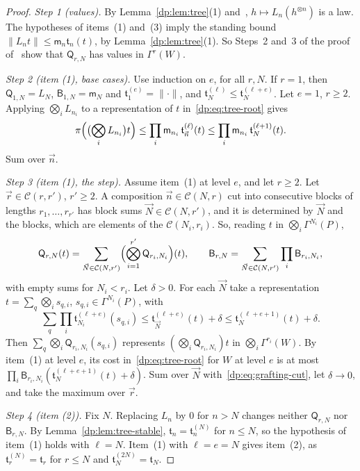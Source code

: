 \documentclass[11pt]{amsart}
\theoremstyle{definition}
\theoremstyle{remark}
\numberwithin{equation}{section}
\newcommand{\norm}[1]{\lVert #1\rVert}
\theoremstyle{plain}
\theoremstyle{definition}
\theoremstyle{plain}
\begin{document}
\begin{proof}
\emph{Step 1 (values).} By Lemma~\ref{dp:lem:tree}(1) and~\cite[Lemma~Q.1(2)]{I}, $h\mapsto L_n(h^{\otimes n})$ is a law. The hypotheses of items~(1) and~(3) imply the standing bound $\norm{L_nt}\le\mathsf m_n\mathfrak t_n(t)$, by Lemma~\ref{dp:lem:tree}(1). So Steps~2 and~3 of the proof of~\cite[Lemma~Q.4]{I} show that $\mathsf Q_{r,N}$ has values in $\Gamma^r(W)$.

\emph{Step 2 (item (1), base cases).} Use induction on $e$, for all $r,N$. If $r=1$, then $\mathsf Q_{1,N}=L_N$, $\mathsf B_{1,N}=\mathsf m_N$ and $\mathfrak t^{(e)}_1=\norm\cdot$, and $\mathfrak t^{(\ell)}_N\le\mathfrak t^{(\ell+e)}_N$. Let $e=1$, $r\ge2$. Applying $\bigotimes_iL_{n_i}$ to a representation of $t$ in~\eqref{dp:eq:tree-root} gives
\[
 \pi\Bigl(\bigl(\bigotimes_iL_{n_i}\bigr)t\Bigr)\le\prod_i\mathsf m_{n_i}\,\mathfrak t^{(\ell)}_{\vec n}(t)\le\prod_i\mathsf m_{n_i}\,\mathfrak t^{(\ell+1)}_N(t).
\]
Sum over $\vec n$.

\emph{Step 3 (item (1), the step).} Assume item~(1) at level $e$, and let $r\ge2$. Let $\vec r\in\mathcal C(r,r')$, $r'\ge2$. A composition $\vec n\in\mathcal C(N,r)$ cut into consecutive blocks of lengths $r_1,\dots,r_{r'}$ has block sums $\vec N\in\mathcal C(N,r')$, and it is determined by $\vec N$ and the blocks, which are elements of the $\mathcal C(N_i,r_i)$. So, reading $t$ in $\bigotimes_i\Gamma^{N_i}(P)$,
\begin{equation}\label{dp:eq:grafting-cut}
 \mathsf Q_{r,N}(t)=\sum_{\vec N\in\mathcal C(N,r')}\Bigl(\bigotimes_{i=1}^{r'}\mathsf Q_{r_i,N_i}\Bigr)(t),\qquad
 \mathsf B_{r,N}=\sum_{\vec N\in\mathcal C(N,r')}\prod_i\mathsf B_{r_i,N_i},
\end{equation}
with empty sums for $N_i<r_i$. Let $\delta>0$. For each $\vec N$ take a representation $t=\sum_q\bigotimes_is_{q,i}$, $s_{q,i}\in\Gamma^{N_i}(P)$, with
\[
 \sum_q\prod_i\mathfrak t^{(\ell+e)}_{N_i}(s_{q,i})\le\mathfrak t^{(\ell+e)}_{\vec N}(t)+\delta\le\mathfrak t^{(\ell+e+1)}_N(t)+\delta.
\]
Then $\sum_q\bigotimes_i\mathsf Q_{r_i,N_i}(s_{q,i})$ represents $(\bigotimes_i\mathsf Q_{r_i,N_i})t$ in $\bigotimes_i\Gamma^{r_i}(W)$. By item~(1) at level $e$, its cost in~\eqref{dp:eq:tree-root} for $W$ at level $e$ is at most $\prod_i\mathsf B_{r_i,N_i}(\mathfrak t^{(\ell+e+1)}_N(t)+\delta)$. Sum over $\vec N$ with~\eqref{dp:eq:grafting-cut}, let $\delta\to0$, and take the maximum over $\vec r$.

\emph{Step 4 (item (2)).} Fix $N$. Replacing $L_n$ by $0$ for $n>N$ changes neither $\mathsf Q_{r,N}$ nor $\mathsf B_{r,N}$. By Lemma~\ref{dp:lem:tree-stable}, $\mathfrak t_n=\mathfrak t^{(N)}_n$ for $n\le N$, so the hypothesis of item~(1) holds with $\ell=N$. Item~(1) with $\ell=e=N$ gives item~(2), as $\mathfrak t^{(N)}_r=\mathfrak t_r$ for $r\le N$ and $\mathfrak t^{(2N)}_N=\mathfrak t_N$.


\end{proof}
\end{document}
